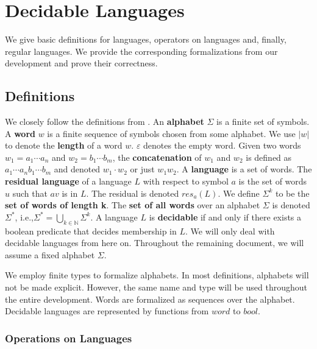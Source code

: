 \chapter{Decidable Languages}
\label{chap:lang}


We give basic definitions for languages, operators on languages and, finally, regular languages.
We provide the corresponding formalizations from our development and prove their correctness.

\section{Definitions}

We closely follow the definitions from \cite{DBLP:books/daglib/0011126}.
An \textbf{alphabet} $\Sigma$ is a finite set of symbols. 
A \textbf{word} $w$ is a finite sequence of symbols chosen from some alphabet. 
We use $|w|$ to denote the \textbf{length} of a word $w$. $\varepsilon$ denotes the empty word.
Given two words $w_1 = a_1 \cdots a_n$ and $w_2 = b_1 \cdots b_m$, the \textbf{concatenation} of $w_1$ and $w_2$ is defined as $a_1 \cdots a_n b_1 \cdots b_m$ and denoted $w_1 \cdot w_2$ or just $w_1 w_2$.
A \textbf{language} is a set of words.
The \textbf{residual language} of a language $L$ with respect to symbol $a$ is the set of words $u$ such that $a v$ is in $L$. The residual is denoted $res_a(L)$.
We define $\Sigma^k$ to be the \textbf{set of words of length k}.
The \textbf{set of all words} over an alphabet $\Sigma$ is denoted $\Sigma^*$, i.e.,$\Sigma^* = \bigcup_{k \in \mathbb{N}} \Sigma^k$.
A language $L$ is \textbf{decidable} if and only if there exists a boolean predicate that decides membership in $L$.
We will only deal with decidable languages from here on.
Throughout the remaining document, we will assume a fixed alphabet $\Sigma$.

     
    We employ finite types to formalize alphabets. 
    In most definitions, alphabets will not be made explicit.
    However, the same name and type will be used throughout the entire development.
    Words are formalized as sequences over the alphabet.
    Decidable languages are represented by functions from $word$ to $bool$.

    \subsection{Operations on Languages}

